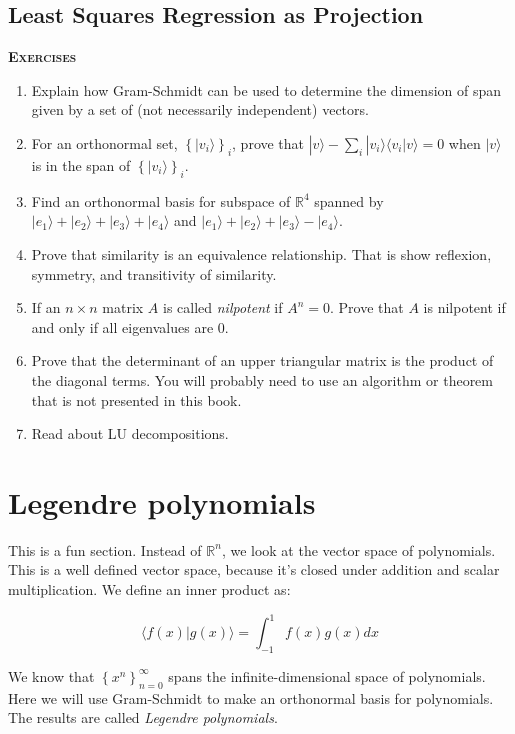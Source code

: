 \documentclass{amsbook}
\begin{document}
\subsection{Least Squares Regression as Projection}

{\bfseries\scshape\Large Exercises}

\begin{enumerate}
\item Explain how Gram-Schmidt can be used to determine the dimension of span given by a set of (not necessarily independent) vectors.
\item For an orthonormal set, $\left\{|v_i\rangle\right\}_i$, prove that $|v\rangle-\sum_i|v_i\rangle\langle v_i|v\rangle=0$ when $|v\rangle$ is in the span of $\left\{|v_i\rangle\right\}_i$.
\item Find an orthonormal basis for subspace of $\mathbb R^4$ spanned by $|e_1\rangle+|e_2\rangle+|e_3\rangle+|e_4\rangle$ and $|e_1\rangle+|e_2\rangle+|e_3\rangle-|e_4\rangle$.
\item Prove that similarity is an equivalence relationship.  That is show reflexion, symmetry, and transitivity of similarity.
\item If an $n\times n$ matrix $A$ is called {\em nilpotent} if $A^n=0$.  Prove that $A$ is nilpotent if and only if all eigenvalues are $0$.
\item\label{determinant-ex} Prove that the determinant of an upper triangular matrix is the product of the diagonal terms.  You will probably need to use an algorithm or theorem that is not presented in this book.
\item Read about LU decompositions.
\end{enumerate}

\section{Legendre polynomials}
This is a fun section.  Instead of $\mathbb R^n$, we look at the vector space of polynomials.  This is a well defined vector space, because it's closed under addition and scalar multiplication.  We define an inner product as:

$$
\langle f(x)|g(x)\rangle = \int_{-1}^1f(x)g(x)dx
$$

We know that $\left\{x^n\right\}_{n=0}^\infty$ spans the infinite-dimensional space of polynomials.  Here we will use Gram-Schmidt to make an orthonormal basis for polynomials.  The results are called {\em Legendre polynomials}.
\end{document}
